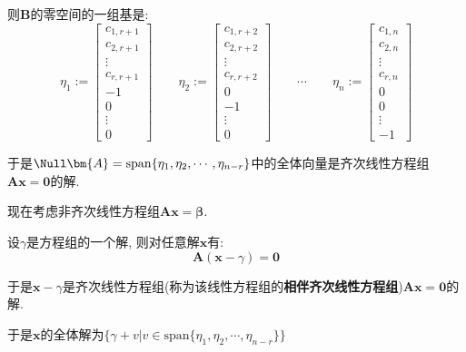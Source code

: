 \documentclass[UTF8]{ctexart}
\begin{document}
		则$\bm{B}$的零空间的一组基是: 
		\[\eta_1:=
		\begin{bmatrix}
			c_{1,r+1}\\
			c_{2,r+1}\\
			\vdots\\
			c_{r,r+1}\\
			-1\\
			0\\
			\vdots\\
			0
		\end{bmatrix}
		\qquad
		\eta_2:=
		\begin{bmatrix}
			c_{1,r+2}\\
			c_{2,r+2}\\
			\vdots\\
			c_{r,r+2}\\
			0\\
			-1\\
			\vdots\\
			0
		\end{bmatrix}
		\qquad
		\cdots
		\qquad
		\eta_n:=
		\begin{bmatrix}
			c_{1,n}\\
			c_{2,n}\\
			\vdots\\
			c_{r,n}\\
			0\\
			0\\
			\vdots\\
			-1
		\end{bmatrix}\]

		于是$\Null\bm{A}=\mathrm{span}\{\eta_1,\eta_2,\cdots,\eta_{n-r}\}$中的全体向量是齐次线性方程组$\bm{A}\bm{x}=\mathbf{0}$的解. 

		现在考虑非齐次线性方程组$\bm{A}\bm{x}=\bm\beta$. 

		设$\gamma$是方程组的一个解, 则对任意解$\bm{x}$有: 
		\[\bm{A}(\bm{x}-\gamma)=\mathbf{0}\]

		于是$\bm{x}-\gamma$是齐次线性方程组(称为该线性方程组的\textbf{相伴齐次线性方程组})$\bm{A}\bm{x}=\mathbf{0}$的解. 

		于是$\bm{x}$的全体解为$\{\gamma+v|v\in\mathrm{span}\{\eta_1,\eta_2,\cdots,\eta_{n-r}\}\}$
\end{document}
